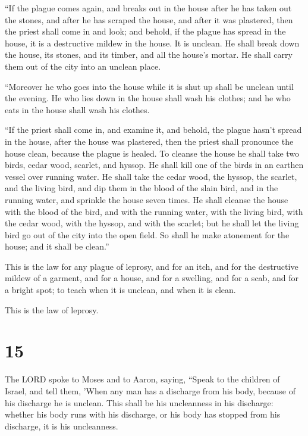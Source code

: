  ``If the plague comes again, and breaks out in the house
after he has taken out the stones, and after he has scraped the house,
and after it was plastered,  then the priest shall come
in and look; and behold, if the plague has spread in the house, it is a
destructive mildew in the house. It is unclean.  He shall
break down the house, its stones, and its timber, and all the house's
mortar. He shall carry them out of the city into an unclean place.

 ``Moreover he who goes into the house while it is shut
up shall be unclean until the evening.  He who lies down
in the house shall wash his clothes; and he who eats in the house shall
wash his clothes.

 ``If the priest shall come in, and examine it, and
behold, the plague hasn't spread in the house, after the house was
plastered, then the priest shall pronounce the house clean, because the
plague is healed.  To cleanse the house he shall take two
birds, cedar wood, scarlet, and hyssop.  He shall kill
one of the birds in an earthen vessel over running water.
 He shall take the cedar wood, the hyssop, the scarlet,
and the living bird, and dip them in the blood of the slain bird, and in
the running water, and sprinkle the house seven times. 
He shall cleanse the house with the blood of the bird, and with the
running water, with the living bird, with the cedar wood, with the
hyssop, and with the scarlet;  but he shall let the
living bird go out of the city into the open field. So shall he make
atonement for the house; and it shall be clean.''

 This is the law for any plague of leprosy, and for an
itch,  and for the destructive mildew of a garment, and
for a house,  and for a swelling, and for a scab, and for
a bright spot;  to teach when it is unclean, and when it
is clean.

This is the law of leprosy.

\hypertarget{section-14}{%
\section{15}\label{section-14}}

 The LORD spoke to Moses and to Aaron, saying,
 ``Speak to the children of Israel, and tell them, 'When
any man has a discharge from his body, because of his discharge he is
unclean.  This shall be his uncleanness in his discharge:
whether his body runs with his discharge, or his body has stopped from
his discharge, it is his uncleanness.


